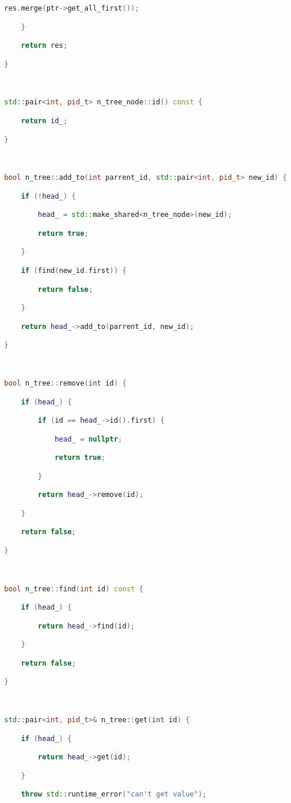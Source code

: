 \begin{lstlisting}[language=C++]
        res.merge(ptr->get_all_first());

    }

    return res;

}



std::pair<int, pid_t> n_tree_node::id() const {

    return id_;

}



bool n_tree::add_to(int parrent_id, std::pair<int, pid_t> new_id) {

    if (!head_) {

        head_ = std::make_shared<n_tree_node>(new_id);

        return true;

    }

    if (find(new_id.first)) {

        return false;

    }

    return head_->add_to(parrent_id, new_id);

}



bool n_tree::remove(int id) {

    if (head_) {

        if (id == head_->id().first) {

            head_ = nullptr;

            return true;

        }

        return head_->remove(id);

    }

    return false;

}



bool n_tree::find(int id) const {

    if (head_) {

        return head_->find(id);

    }

    return false;

}



std::pair<int, pid_t>& n_tree::get(int id) {

    if (head_) {

        return head_->get(id);

    }

    throw std::runtime_error("can't get value");


\end{lstlisting}

